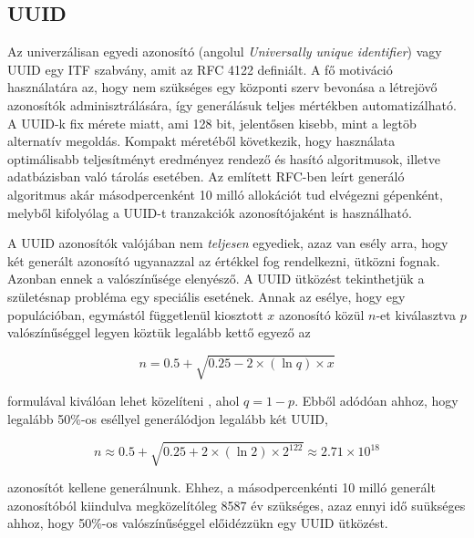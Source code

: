 \subsection{UUID}

Az univerzálisan egyedi azonosító (angolul \emph{Universally unique identifier}) vagy UUID egy ITF szabvány, amit az RFC 4122 definiált. A fő motiváció használatára az, hogy nem szükséges egy központi szerv bevonása a létrejövő azonosítók adminisztrálására, így generálásuk teljes mértékben automatizálható. A UUID-k fix mérete miatt, ami 128 bit, jelentősen kisebb, mint a legtöb alternatív megoldás. Kompakt méretéből következik, hogy használata optimálisabb teljesítményt eredményez rendező és hasító algoritmusok, illetve adatbázisban való tárolás esetében. Az említett RFC-ben leírt generáló algoritmus akár másodpercenként 10 milló allokációt tud elvégezni gépenként, melyből kifolyólag a UUID-t tranzakciók azonosítójaként is használható. \par

A UUID azonosítók valójában nem \emph{teljesen} egyediek, azaz van esély arra, hogy két generált azonosító ugyanazzal az értékkel fog rendelkezni, ütközni fognak. Azonban ennek a valószínűsége elenyésző. A UUID ütközést tekinthetjük a születésnap probléma egy speciális esetének. Annak az esélye, hogy egy populációban, egymástól függetlenül kiosztott $x$ azonosító közül $n$-et kiválasztva $p$ valószínűséggel legyen köztük legalább kettő egyező az

\begin{equation*}
	n = 0.5 + \sqrt{0.25 - 2\times(\ln q)\times x}
\end{equation*}

formulával kiválóan lehet közelíteni \cite{mathis1991generalized}, ahol $q = 1 - p$. Ebből adódóan ahhoz, hogy legalább 50\%-os eséllyel generálódjon legalább két UUID,

\begin{equation*}
	n \approx 0.5 + \sqrt{0.25 + 2\times(\ln 2)\times2^{122}} \approx 2.71 \times 10^{18}
\end{equation*}

azonosítót kellene generálnunk. Ehhez, a másodpercenkénti 10 milló generált azonosítóból kiindulva megközelítóleg 8587 év szükséges, azaz ennyi idő suükséges ahhoz, hogy 50\%-os valószínűséggel előidézzükn egy UUID ütközést.